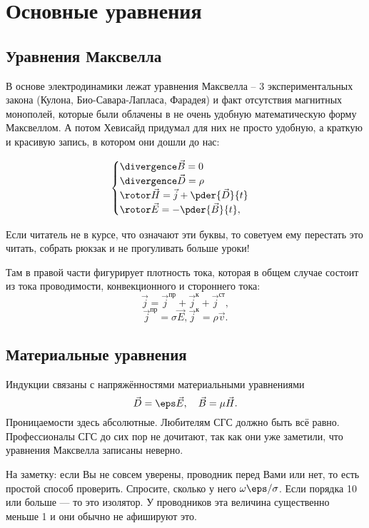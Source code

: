 \chapter{Основные уравнения}
\section{Уравнения Максвелла}
    В основе электродинамики лежат уравнения Максвелла -- 3 экспериментальных
    закона (Кулона, Био-Савара-Лапласа, Фарадея) и факт отсутствия магнитных
    монополей, которые были облачены в не очень удобную математическую форму
    Максвеллом. А потом Хевисайд придумал для них не просто удобную, а краткую и
    красивую запись, в котором они дошли до нас:

    \[
      \begin{cases}
        \divergence \vec{B} = 0\\
        \divergence\vec{D} = \rho\\
        \rotor\vec{H} = \vec{j} + \pder{\vec{D}}{t}\\
        \rotor\vec{E} = -\pder{\vec{B}}{t},
      \end{cases}
    \]

    Если читатель не в курсе, что означают эти буквы, то советуем ему перестать
    это читать, собрать рюкзак и не прогуливать больше уроки!

    Там в правой части фигурирует плотность тока, которая в общем случае состоит
    из тока проводимости, конвекционного и стороннего тока:
    \[
        \vec{j} = \vec{j}^\text{пр} + \vec{j}^\text{к} + \vec{j}^\text{ст},
    \]
    \[
        \vec{j}^\text{пр} = \sigma\vec{E}, \vec{j}^\text{к} = \rho\vec{v}.
    \]

\section{Материальные уравнения}
    Индукции связаны с напряжённостями материальными уравнениями
    \[
        \vec{D} = \eps\vec{E},\quad
        \vec{B} = \mu\vec{H}.
    \]
    Проницаемости здесь абсолютные. Любителям СГС должно быть всё равно.
    Профессионалы СГС до сих пор не дочитают, так как они уже заметили,
    что уравнения Максвелла записаны неверно.

    На заметку: если Вы не совсем уверены, проводник перед Вами или нет, то есть
    простой способ проверить. Спросите, сколько у него \(\omega\eps/\sigma\).
    Если порядка 10 или больше --- то это изолятор. У проводников эта величина
    существенно меньше 1 и они обычно не афишируют это.

